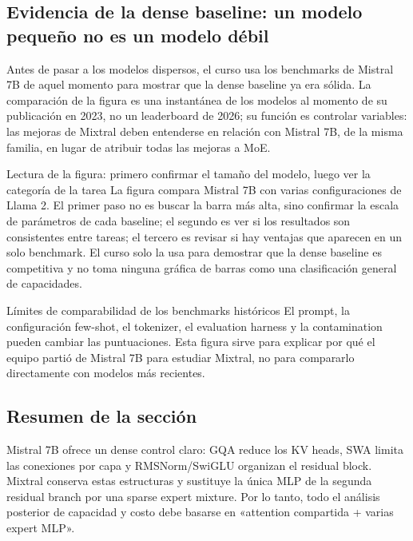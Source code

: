 
\subsection{Evidencia de la dense baseline: un modelo pequeño no es un modelo débil}

Antes de pasar a los modelos dispersos, el curso usa los benchmarks de Mistral 7B de aquel momento para mostrar que la dense baseline ya era sólida. La comparación de la figura es una instantánea de los modelos al momento de su publicación en 2023, no un leaderboard de 2026; su función es controlar variables: las mejoras de Mixtral deben entenderse en relación con Mistral 7B, de la misma familia, en lugar de atribuir todas las mejoras a MoE.


\begin{knowledgebox}{Lectura de la figura: primero confirmar el tamaño del modelo, luego ver la categoría de la tarea}
La figura compara Mistral 7B con varias configuraciones de Llama 2. El primer paso no es buscar la barra más alta, sino confirmar la escala de parámetros de cada baseline; el segundo es ver si los resultados son consistentes entre tareas; el tercero es revisar si hay ventajas que aparecen en un solo benchmark. El curso solo la usa para demostrar que la dense baseline es competitiva y no toma ninguna gráfica de barras como una clasificación general de capacidades.
\end{knowledgebox}

\begin{warningbox}{Límites de comparabilidad de los benchmarks históricos}
El prompt, la configuración few-shot, el tokenizer, el evaluation harness y la contamination pueden cambiar las puntuaciones. Esta figura sirve para explicar por qué el equipo partió de Mistral 7B para estudiar Mixtral, no para compararlo directamente con modelos más recientes.
\end{warningbox}

\subsection{Resumen de la sección}

Mistral 7B ofrece un dense control claro: GQA reduce los KV heads, SWA limita las conexiones por capa y RMSNorm/SwiGLU organizan el residual block. Mixtral conserva estas estructuras y sustituye la única MLP de la segunda residual branch por una sparse expert mixture. Por lo tanto, todo el análisis posterior de capacidad y costo debe basarse en «attention compartida + varias expert MLP».
